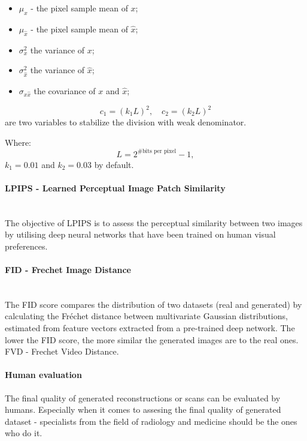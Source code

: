 \begin{itemize}
    \item $\mu_{x}$ - the pixel sample mean of $x$;  
    \item $\mu_{\hat{x}}$ - the pixel sample mean of $\hat{x}$;  
    \item $\sigma_{x}^{2}$ the variance of $x$;  
    \item $\sigma_{\hat{x}}^{2}$ the variance of $\hat{x}$;  
    \item $\sigma_{x\hat{x}}$ the covariance of $x$ and $\hat{x}$;  
\end{itemize}

\[
c_{1} = (k_{1}L)^{2}, \quad c_{2} = (k_{2}L)^{2}
\]
are two variables to stabilize the division with weak denominator.

Where:
\[
L = 2^{\#\text{bits per pixel}} - 1,
\]
$k_{1} = 0.01$ and $k_{2} = 0.03$ by default.

\paragraph{LPIPS - Learned Perceptual Image Patch Similarity}\mbox{}\\
The objective of LPIPS is to assess the perceptual similarity between two images by utilising deep neural networks that have been trained on human visual preferences.

\paragraph{FID - Frechet Image Distance}\mbox{}\\
The FID score compares the distribution of two datasets (real and generated) by calculating the Fréchet distance between multivariate Gaussian distributions, estimated from feature vectors extracted from a pre-trained deep network. The lower the FID score, the more similar the generated images are to the real ones. FVD - Frechet Video Distance.

\paragraph{Human evaluation}
The final quality of generated reconstructions or scans can be evaluated by humans. Especially when it comes to assesing the final quality of generated dataset - specialists from the field of radiology and medicine should be the ones who do it. 